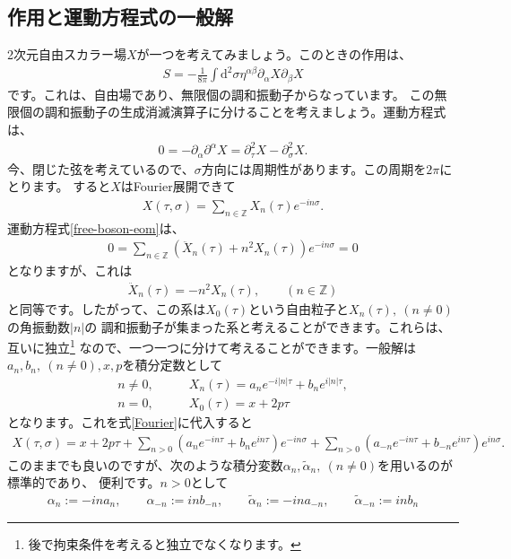 \documentclass[report,paper=a4, fontsize=12pt, line_length=16cm, number_of_lines=34,dvipdfmx]{jlreq}
\numberwithin{equation}{chapter}
\numberwithin{equation}{section}
\newcommand{\Zb}{\mathbb{Z}}
\newcommand{\del}{\partial}
\newcommand{\alphat}{\tilde{\alpha}}
\newcommand{\di}{\mathrm{d}}
\begin{document}
\subsection{作用と運動方程式の一般解}
2次元自由スカラー場$X$が一つを考えてみましょう。このときの作用は、
\begin{align}
S=-\frac{1}{8\pi}\int \di^2\sigma \eta^{\alpha\beta}\del_{\alpha} X \del_{\beta} X
\label{free-boson-action}
\end{align}
です。これは、自由場であり、無限個の調和振動子からなっています。
この無限個の調和振動子の生成消滅演算子に分けることを考えましょう。運動方程式は、
\begin{align}
0=-\del_{\alpha}\del^{\alpha}X=\del_{\tau}^2 X-\del_{\sigma}^2 X.
\label{free-boson-eom}
\end{align}
今、閉じた弦を考えているので、$\sigma$方向には周期性があります。この周期を$2\pi$にとります。
すると$X$はFourier展開できて
\begin{align}
  X(\tau,\sigma)=\sum_{n\in \Zb} X_n(\tau)e^{-in\sigma}. \label{Fourier}
\end{align}
運動方程式\eqref{free-boson-eom}は、
\begin{align}
  0=\sum_{n\in \Zb} (\ddot{X}_{n}(\tau)+n^2 X_{n}(\tau))e^{-in\sigma}=0
\end{align}
となりますが、これは
\begin{align}
\ddot{X}_n(\tau)=-n^2 X_n(\tau),\qquad (n\in \Zb)
\end{align}
と同等です。したがって、この系は$X_0(\tau)$という自由粒子と$X_{n}(\tau),\ (n\ne 0)$ の角振動数$|n|$の
調和振動子が集まった系と考えることができます。これらは、互いに独立\footnote{後で拘束条件を考えると独立でなくなります。}
なので、一つ一つに分けて考えることができます。一般解は$a_n, b_n, \ (n\ne0),x, p$を積分定数として
\begin{align}
n\ne 0,\qquad & X_{n}(\tau)=a_n e^{-i|n|\tau}+b_n e^{i|n|\tau},\\
n = 0,\qquad & X_{0}(\tau)=x+2p\tau
\end{align}
となります。これを式\eqref{Fourier}に代入すると
\begin{align}
X(\tau,\sigma)=
x+2p\tau
+\sum_{n>0} (a_ne^{-in\tau}+b_n e^{in\tau})e^{-in\sigma}
+\sum_{n>0} (a_{-n}e^{-in\tau}+b_{-n}e^{in\tau})e^{in\sigma}.
\end{align}
このままでも良いのですが、次のような積分変数$\alpha_n,\alphat_n,\ (n\ne 0)$を用いるのが標準的であり、
便利です。$n>0$として
\begin{align}
\alpha_n:=-ina_n,\qquad \alpha_{-n}:=inb_{-n},\qquad
\alphat_n:=-in a_{-n},\qquad \alphat_{-n}:=inb_{n}
\end{align}
\end{document}
